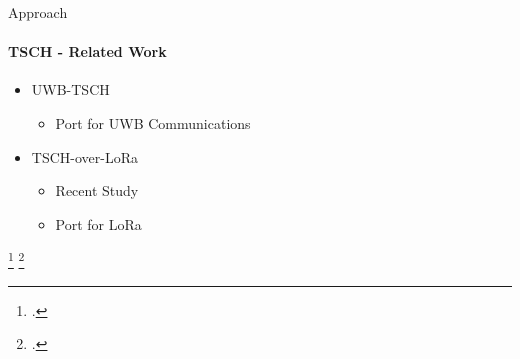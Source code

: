 \begin{frame}{Approach}
\framesubtitle{TSCH - Related Work}
\begin{itemize}
    \item UWB-TSCH
    \begin{itemize}
      \item Port for UWB Communications
    \end{itemize}
    \item TSCH-over-LoRa
    \begin{itemize}
      \item Recent Study
      \item Port for LoRa
    \end{itemize}
\end{itemize}
\footcitetext{tschoverlora}
\footcitetext{uwbtsch}
\end{frame}

